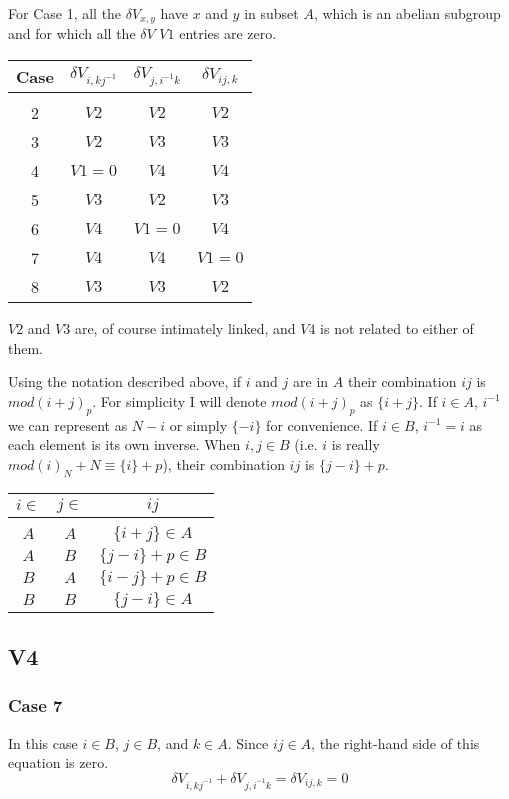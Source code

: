 \documentclass{revtex4-1}
\begin{document}
\par
For Case 1, all the $\delta V_{x,y}$ have $x$ and $y$ in subset $A$, which is
an abelian subgroup and for which all the $\delta V$ $V1$ entries are
zero.  

\begin{tabular}{c|ccc}
Case & $\delta V_{i,kj^{-1}}$ & $\delta V_{j,i^{-1}k}$ & $\delta V_{ij,k}$ \\ \hline \\
2 & $V2$ & $V2$ & $V2$ \\
3 & $V2$ & $V3$ & $V3$ \\
4 & $V1=0$ & $V4$ & $V4$ \\
5 & $V3$ & $V2$ & $V3$ \\ 
6 & $V4$ & $V1=0$ & $V4$ \\ 
7 & $V4$ & $V4$ & $V1=0$ \\ 
8 & $V3$ & $V3$ & $V2$ 
\end{tabular}

\par $V2$ and $V3$ are, of course intimately linked, and $V4$ is not related to 
either of them.

\par Using the notation described above, if $i$ and $j$ are in $A$ their combination
$ij$ is $mod(i+j)_p$.  For simplicity I will denote $mod(i+j)_p$ as $\{i+j\}$.  If 
$i \in A$, $i^{-1}$
we can represent as $N-i$ or simply $\{-i\}$ for convenience.  If $i \in B$, $i^{-1} = i$ as
each element is its own inverse.
When $i,j \in B$ (i.e. $i$ is really $mod(i)_N +N \equiv \{i\}+p$),
their combination $ij$ is $\{j-i\}+p$.

\begin{tabular}{cc|c}
$i \in$  & $j \in$ & $ij$ \\ \hline \\
$A$ & $A$ & $\{i+j\} \in A$ \\
$A$ & $B$ & $\{j-i\} +p \in B$ \\
$B$ & $A$ & $\{i-j\} +p \in B$ \\
$B$ & $B$ & $\{j-i\} \in A$
\end{tabular}


\subsection{V4}
\subsubsection{Case 7}
In this case $i \in B$, $j \in B$, and $k \in A$.  Since $ij \in A$, the right-hand
side of this equation is zero.
$$\delta V_{i,kj^{-1}} + \delta V_{j,i^{-1}k} = \delta V_{ij,k} =0$$
\end{document}
